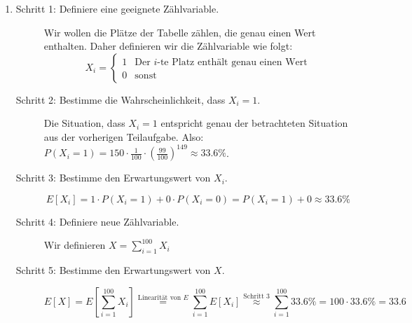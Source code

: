\documentclass[11pt,a4paper]{article}
\begin{document}
\begin{loesung}
\begin{enumerate}
        \item
        \begin{description}
            \item[Schritt 1: Definiere eine geeignete Zählvariable.]
            Wir wollen die Plätze der Tabelle zählen, die genau einen Wert enthalten.
            Daher definieren wir die Zählvariable wie folgt:
            \begin{equation*}
                X_i = \begin{cases}
                    1 & \text{Der $i$-te Platz enthält genau einen Wert} \\
                    0 & \text{sonst}
                \end{cases}
            \end{equation*}
            \item[Schritt 2: Bestimme die Wahrscheinlichkeit, dass $X_i = 1$.]
            Die Situation, dass $X_i = 1$ entspricht genau der betrachteten Situation aus der vorherigen Teilaufgabe.
            Also: $P(X_i = 1) = 150 \cdot \frac{1}{100}\cdot \left(\frac{99}{100}\right)^{149} \approx 33.6\%$.
            \item[Schritt 3: Bestimme den Erwartungswert von $X_i$.]
            \begin{equation*}
                E[X_i] = 1 \cdot P(X_i = 1) + 0 \cdot P(X_i = 0) = P(X_i = 1) + 0 \approx 33.6\%
            \end{equation*}
            \item[Schritt 4: Definiere neue Zählvariable.]
            Wir definieren $X = \sum\limits_{i = 1}^{100} X_i$
            \item[Schritt 5: Bestimme den Erwartungswert von $X$.]
            \begin{equation*}
                E[X] = E\left[ \sum\limits_{i = 1}^{100} X_i \right]
                \overset{\text{Linearität von $E$}}{=} \sum\limits_{i = 1}^{100} E[X_i]
                \overset{\text{Schritt 3}}{\approx} \sum\limits_{i = 1}^{100} 33.6\% = 100 \cdot 33.6\% = 33.6
            \end{equation*}
        \end{description}
        
    \end{enumerate}
\end{loesung}
\end{document}
